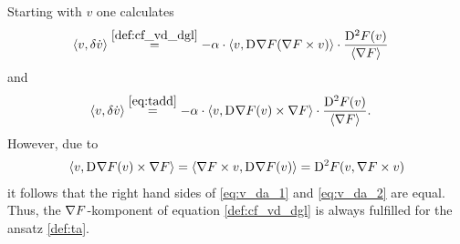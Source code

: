 Starting with $ v $ one calculates
\begin{align}
    \langle  v ,  \delta \dot{ v }  \rangle  &\overset{\eqref{def:cf_vd_dgl}}{=}
    -\alpha \cdot \langle  v ,  \mathrm{D}^{  }\nabla F( \nabla F \times v )  \rangle  \cdot
    \frac{ \mathrm{D}^{ 2 }F( v ) }{ \langle  \nabla F  \rangle }
    \label{eq:v_da_1}
\end{align}
and
\begin{align}
    \langle  v ,  \delta \dot{ v }  \rangle  &\overset{\eqref{eq:tadd}}{=}
    -\alpha \cdot \langle  v ,  \mathrm{D}^{  }\nabla F( v ) \times \nabla F  \rangle  \cdot
    \frac{ \mathrm{D}^{ 2 }F( v ) }{ \langle  \nabla F   \rangle } .
    \label{eq:v_da_2}
\end{align}
However, due to
\begin{align}
    \langle  v ,  \mathrm{D}^{  }\nabla F( v ) \times \nabla F  \rangle  =
    \langle  \nabla F \times v ,  \mathrm{D}^{  }\nabla F( v )  \rangle  =
    \mathrm{D}^{ 2 }F( v, \nabla F \times v )
\end{align}
it follows that the right hand sides
of \eqref{eq:v_da_1} and \eqref{eq:v_da_2} are equal.
Thus, the $ \nabla F $-komponent of equation \eqref{def:cf_vd_dgl}
is always fulfilled for the ansatz \eqref{def:ta}.


